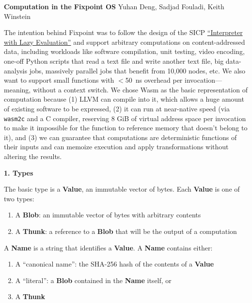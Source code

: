 \documentclass{article}
\newcommand{\blob}{\textbf{Blob}\xspace}
\newcommand{\valuex}{\textbf{Value}\xspace}
\newcommand{\thunk}{\textbf{Thunk}\xspace}
\newcommand{\name}{\textbf{Name}\xspace}
\begin{document}
\textbf{Computation in the Fixpoint OS}\newline
Yuhan Deng, Sadjad Fouladi, Keith Winstein

The intention behind Fixpoint was to follow the design of the SICP
\href{https://mitpress.mit.edu/sites/default/files/sicp/full-text/book/book-Z-H-27.html#\%_sec_4.2.2}{``Interpreter
  with Lazy Evaluation''} and support arbitrary computations on
content-addressed data, including workloads like software compilation,
unit testing, video encoding, one-off Python scripts that read a text
file and write another text file, big data-analysis jobs, massively
parallel jobs that benefit from 10,000 nodes, etc. We also want to
support small functions with
$<$50~ns overhead per invocation---meaning, without a context
switch. We chose Wasm as the basic representation of computation
because (1) LLVM can compile into it, which allows a huge amount of
existing software to be expressed, (2) it can run at near-native speed
(via \texttt{wasm2c} and a C compiler, reserving 8 GiB of virtual
address space per invocation to make it impossible for the function to
reference memory that doesn't belong to it), and (3) we can guarantee
that computations are deterministic functions of their inputs and can
memoize execution and apply transformations without altering the
results.

\vspace{0.5\baselineskip}
{\Large \textbf{1. Types}}

The basic type is a \valuex, an immutable vector of bytes. Each \valuex is one of two types:
\begin{enumerate}[topsep=0pt]
\item A \blob: an immutable vector of bytes with arbitrary contents

\item A \thunk: a reference to a \blob that will be the output of a computation
\end{enumerate}

A \name is a string that identifies a \valuex. A \name contains either:
\begin{enumerate}[topsep=0pt]
\item A ``canonical name'': the SHA-256 hash of the contents of a \valuex

\item A ``literal'': a \blob contained in the \name itself, or
  
\item A \thunk
\end{enumerate}
\end{document}
